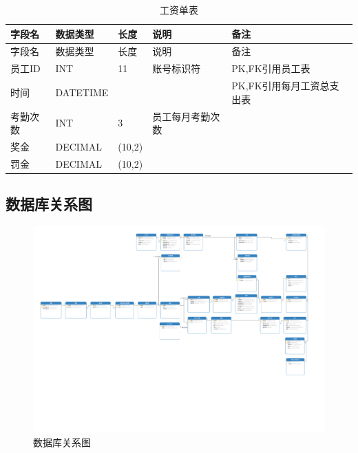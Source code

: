 \documentclass[]{article}
\let\oldincludegraphics\includegraphics
\renewcommand{\includegraphics}[2][]{%
  \begin{center}\oldincludegraphics[#1]{#2}\end{center}%
}
\begin{document}
\begin{longtable}[]{@{}lllll@{}}
\caption{工资单表}\\
\toprule
字段名 & 数据类型 & 长度 & 说明 & 备注 \\
\midrule
\endfirsthead
\toprule
字段名 & 数据类型 & 长度 & 说明 & 备注 \\
\midrule
\endhead
员工ID & INT & 11 & 账号标识符 & PK,FK引用员工表 \\
时间 & DATETIME &  &  & PK,FK引用每月工资总支出表 \\
考勤次数 & INT & 3 & 员工每月考勤次数 & \\
奖金 & DECIMAL & (10,2) &  & \\
罚金 & DECIMAL & (10,2) &  & \\
\bottomrule
\end{longtable}

\hypertarget{ux6570ux636eux5e93ux5173ux7cfbux56fe}{%
\subsection{数据库关系图}\label{ux6570ux636eux5e93ux5173ux7cfbux56fe}}

\begin{figure}[htbp]
\centering
\includegraphics{image15.png}
\caption{数据库关系图}
\end{figure}
\end{document}
